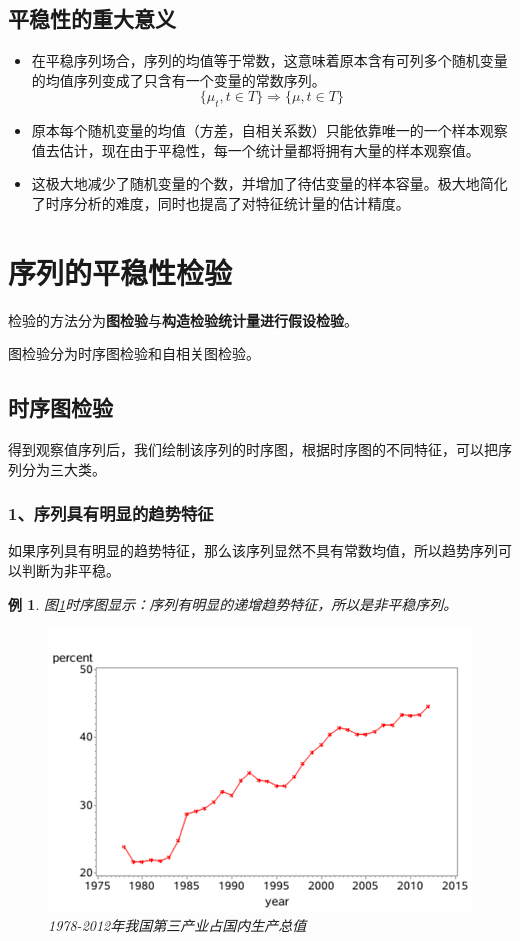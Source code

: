 \documentclass[12pt, a4paper, oneside]{ctexbook}
\newtheorem{example}[theorem]{例}
\begin{document}
\subsection{平稳性的重大意义}
\begin{itemize}
    \item 在平稳序列场合，序列的均值等于常数，这意味着原本含有可列多个随机变量的均值序列变成了只含有一个变量的常数序列。
          \begin{equation}
              \{\mu_t,t\in T\}\Rightarrow\{\mu,t\in T\}
          \end{equation}
    \item 原本每个随机变量的均值（方差，自相关系数）只能依靠唯一的一个样本观察值去估计，现在由于平稳性，每一个统计量都将拥有大量的样本观察值。
    \item 这极大地减少了随机变量的个数，并增加了待估变量的样本容量。极大地简化了时序分析的难度，同时也提高了对特征统计量的估计精度。
\end{itemize}

\section{序列的平稳性检验}
检验的方法分为\textbf{图检验}与\textbf{构造检验统计量进行假设检验}。

图检验分为时序图检验和自相关图检验。
\subsection{时序图检验}
得到观察值序列后，我们绘制该序列的时序图，根据时序图的不同特征，可以把序列分为三大类。
\subsubsection{1、序列具有明显的趋势特征}
如果序列具有明显的趋势特征，那么该序列显然不具有常数均值，所以趋势序列可以判断为非平稳。
\begin{example}
    图\ref{im2_1}时序图显示：序列有明显的递增趋势特征，所以是非平稳序列。
    \begin{figure}[h]
        \centering
        \includegraphics[scale = 0.6]{img/2_1.png}
        \caption{1978-2012年我国第三产业占国内生产总值}
        \label{im2_1}
    \end{figure}
\end{example}
\end{document}
